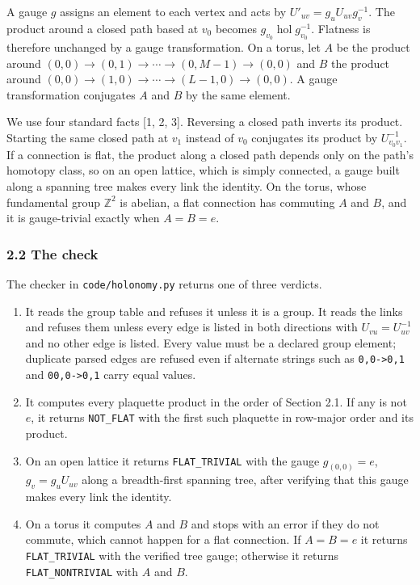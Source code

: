 \documentclass[
  11pt,
]{article}
\providecommand{\tightlist}{%
  \setlength{\itemsep}{0pt}\setlength{\parskip}{0pt}}
\begin{document}
A gauge \(g\) assigns an element to each vertex and acts by
\(U'_{uv} = g_u U_{uv} g_v^{-1}\). The product around a closed path
based at \(v_0\) becomes \(g_{v_0} \operatorname{hol} g_{v_0}^{-1}\).
Flatness is therefore unchanged by a gauge transformation. On a torus,
let \(A\) be the product around
\((0,0) \to (0,1) \to \cdots \to (0,M-1) \to (0,0)\) and \(B\) the
product around \((0,0) \to (1,0) \to \cdots \to (L-1,0) \to (0,0)\). A
gauge transformation conjugates \(A\) and \(B\) by the same element.

We use four standard facts {[}1, 2, 3{]}. Reversing a closed path
inverts its product. Starting the same closed path at \(v_1\) instead of
\(v_0\) conjugates its product by \(U_{v_0 v_1}^{-1}\). If a connection
is flat, the product along a closed path depends only on the path's
homotopy class, so on an open lattice, which is simply connected, a
gauge built along a spanning tree makes every link the identity. On the
torus, whose fundamental group \(\mathbb{Z}^2\) is abelian, a flat
connection has commuting \(A\) and \(B\), and it is gauge-trivial
exactly when \(A = B = e\).

\hypertarget{the-check}{%
\subsubsection{2.2 The check}\label{the-check}}

The checker in \texttt{code/\allowbreak{}holonomy.py} returns one of
three verdicts.

\begin{enumerate}
\def\labelenumi{\arabic{enumi}.}
\tightlist
\item
  It reads the group table and refuses it unless it is a group. It reads
  the links and refuses them unless every edge is listed in both
  directions with \(U_{vu} = U_{uv}^{-1}\) and no other edge is listed.
  Every value must be a declared group element; duplicate parsed edges
  are refused even if alternate strings such as
  \texttt{0,0-\allowbreak{}>0,1} and \texttt{00,0-\allowbreak{}>0,1}
  carry equal values.
\item
  It computes every plaquette product in the order of Section 2.1. If
  any is not \(e\), it returns \texttt{NOT\_\allowbreak{}FLAT} with the
  first such plaquette in row-major order and its product.
\item
  On an open lattice it returns \texttt{FLAT\_\allowbreak{}TRIVIAL} with
  the gauge \(g_{(0,0)} = e\), \(g_v = g_u U_{uv}\) along a
  breadth-first spanning tree, after verifying that this gauge makes
  every link the identity.
\item
  On a torus it computes \(A\) and \(B\) and stops with an error if they
  do not commute, which cannot happen for a flat connection. If
  \(A = B = e\) it returns \texttt{FLAT\_\allowbreak{}TRIVIAL} with the
  verified tree gauge; otherwise it returns
  \texttt{FLAT\_\allowbreak{}NONTRIVIAL} with \(A\) and \(B\).
\end{enumerate}
\end{document}
